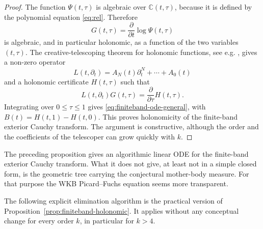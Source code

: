 \documentclass[10pt,twoside,a4paper,reqno]{amsart}
\theoremstyle{plain}
\theoremstyle{definition}
\theoremstyle{remark}
\begin{document}
\begin{proof}
The function $\Psi(t,\tau)$ is algebraic over $\mathbb C(t,\tau)$, because it is
defined by the polynomial equation \eqref{eq:rel}.  Therefore
\[
        G(t,\tau)=\frac{\partial}{\partial t}\log\Psi(t,\tau)
\]
is algebraic, and in particular holonomic, as a function of the two variables
$(t,\tau)$.  The creative-telescoping theorem for holonomic functions, see e.g.
\cite{Zeilberger}, gives a non-zero operator
\[
        L(t,\partial_t)=A_N(t)\partial_t^N+\cdots+A_0(t)
\]
and a holonomic certificate $H(t,\tau)$ such that
\[
        L(t,\partial_t)G(t,\tau)=\frac{\partial}{\partial\tau}H(t,\tau).
\]
Integrating over $0\leq \tau\leq 1$ gives \eqref{eq:finiteband-ode-general}, with
$B(t)=H(t,1)-H(t,0)$.  This proves holonomicity of the finite-band exterior
Cauchy transform.  The argument is constructive, although the order and the
coefficients of the telescoper can grow quickly with $k$.
\end{proof}

The preceding proposition gives an algorithmic linear
ODE for the finite-band exterior Cauchy transform.  What it does not give, at
least not in a simple closed form, is the geometric tree carrying the conjectural
mother-body measure.  For that purpose the WKB Picard--Fuchs equation seems more
transparent.

\medskip
The following explicit elimination algorithm is the practical version of Proposition~\ref{prop:finiteband-holonomic}.  It applies without any conceptual change for every order $k$, in particular for $k>4$.
\end{document}
